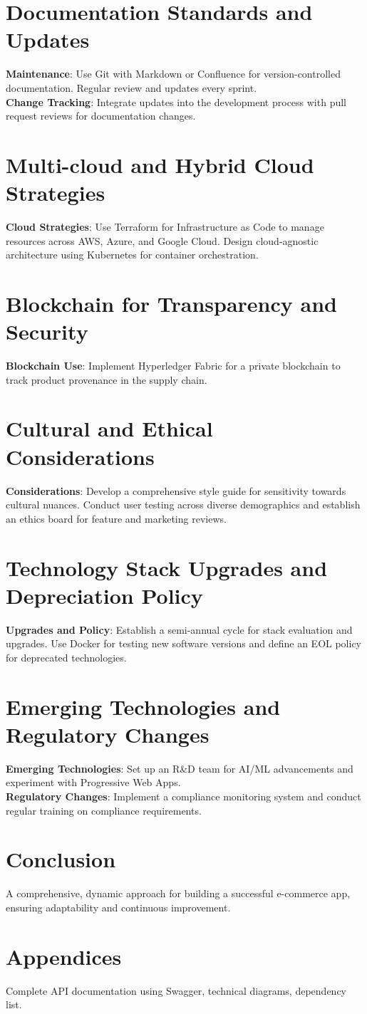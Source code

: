 \documentclass[a4paper,12pt]{article}
\begin{document}
	\section*{Documentation Standards and Updates}
	\textbf{Maintenance}: Use Git with Markdown or Confluence for version-controlled documentation. Regular review and updates every sprint. \\
	\textbf{Change Tracking}: Integrate updates into the development process with pull request reviews for documentation changes.
	
	\section*{Multi-cloud and Hybrid Cloud Strategies}
	\textbf{Cloud Strategies}: Use Terraform for Infrastructure as Code to manage resources across AWS, Azure, and Google Cloud. Design cloud-agnostic architecture using Kubernetes for container orchestration.
	
	\section*{Blockchain for Transparency and Security}
	\textbf{Blockchain Use}: Implement Hyperledger Fabric for a private blockchain to track product provenance in the supply chain.
	
	\section*{Cultural and Ethical Considerations}
	\textbf{Considerations}: Develop a comprehensive style guide for sensitivity towards cultural nuances. Conduct user testing across diverse demographics and establish an ethics board for feature and marketing reviews.
	
	\section*{Technology Stack Upgrades and Depreciation Policy}
	\textbf{Upgrades and Policy}: Establish a semi-annual cycle for stack evaluation and upgrades. Use Docker for testing new software versions and define an EOL policy for deprecated technologies.
	
	\section*{Emerging Technologies and Regulatory Changes}
	\textbf{Emerging Technologies}: Set up an R\&D team for AI/ML advancements and experiment with Progressive Web Apps. \\
	\textbf{Regulatory Changes}: Implement a compliance monitoring system and conduct regular training on compliance requirements.
	
	\section*{Conclusion}
	A comprehensive, dynamic approach for building a successful e-commerce app, ensuring adaptability and continuous improvement.
	
	\section*{Appendices}
	Complete API documentation using Swagger, technical diagrams, dependency list.
	
\end{document}
